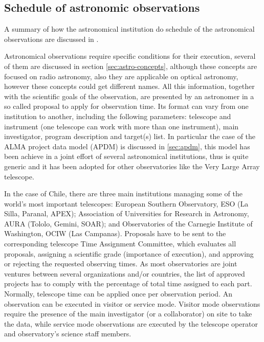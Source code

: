 \documentclass[11pt]{article}
\begin{document}
\subsection{Schedule of astronomic observations}

A summary of how the astronomical institution do schedule of the astronomical observations are discussed in \cite{mora11}.

Astronomical observations require specific conditions for their execution, several of them are discussed in section \ref{sec:astro-concepts}, although these concepts are focused on radio astronomy, also they are applicable on optical astronomy, however these concepts could get different names. All this information, together with the scientific goals of the observation, are presented by an astronomer in a so called proposal to apply for observation time. Its format can vary from one institution to another, including the following parameters: telescope and instrument (one telescope can work with more than one instrument), main investigator, program description and target(s) list. In particular the case of the ALMA project data model (APDM) is discussed in \ref{sec:apdm}, this model has been achieve in a joint effort of several astronomical institutions, thus is quite generic and it has been adopted for other observatories like the Very Large Array telescope.

In the case of Chile, there are three main institutions managing some of the world’s most important telescopes: European Southern Observatory, ESO (La Silla, Paranal, APEX); Association of Universities for Research in Astronomy, AURA (Tololo, Gemini, SOAR); and Observatories of the Carnegie Institute of Washington, OCIW (Las Campanas). Proposals have to be sent to the corresponding telescope Time Assignment Committee, which evaluates all proposals, assigning a scientific grade (importance of execution), and approving or rejecting the requested observing times. As most observatories are joint ventures between several organizations and/or countries, the list of approved projects has to comply with the percentage of total time assigned to each part. Normally, telescope time can be applied once per observation period. An observation can be executed in visitor or service mode. Visitor mode observations require the presence of the main investigator (or a collaborator) on site to take the data, while service mode observations are executed by the telescope operator and observatory’s science staff members.
\end{document}
